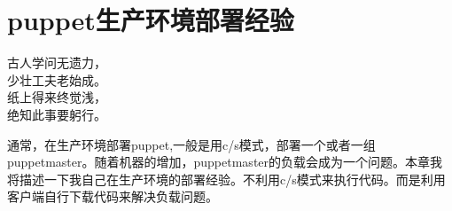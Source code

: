 \chapter{\msyh puppet生产环境部署经验}
\begin{center}
\kai
古人学问无遗力，\\
少壮工夫老始成。 \\
纸上得来终觉浅，\\
绝知此事要躬行。 \\
\end{center}

通常，在生产环境部署puppet,一般是用c/s模式，部署一个或者一组puppetmaster。随着机器的增加，puppetmaster的负载会成为一个问题。本章我将描述一下我自己在生产环境的部署经验。不利用c/s模式来执行代码。而是利用客户端自行下载代码来解决负载问题。\par


